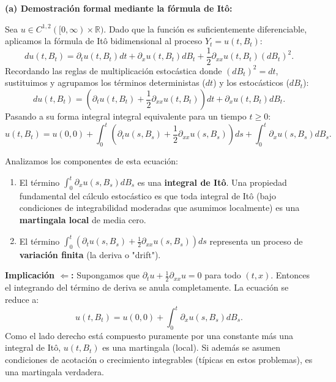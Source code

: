 \documentclass[11pt, letterpaper]{article}
\begin{document}
\begin{solucion}
    \vspace{3mm}
    \textbf{(a) Demostración formal mediante la fórmula de Itô:}

    Sea $u \in C^{1,2}([0, \infty) \times \mathbb{R})$. Dado que la función es suficientemente diferenciable, aplicamos la fórmula de Itô bidimensional al proceso $Y_t = u(t, B_t)$:
    \[ du(t, B_t) = \partial_t u(t, B_t) dt + \partial_x u(t, B_t) dB_t + \frac{1}{2} \partial_{xx} u(t, B_t) (dB_t)^2. \]
    Recordando las reglas de multiplicación estocástica donde $(dB_t)^2 = dt$, sustituimos y agrupamos los términos deterministas ($dt$) y los estocásticos ($dB_t$):
    \[ du(t, B_t) = \left( \partial_t u(t, B_t) + \frac{1}{2} \partial_{xx} u(t, B_t) \right) dt + \partial_x u(t, B_t) dB_t. \]
    Pasando a su forma integral integral equivalente para un tiempo $t \ge 0$:
    \[ u(t, B_t) = u(0, 0) + \int_0^t \left( \partial_t u(s, B_s) + \frac{1}{2} \partial_{xx} u(s, B_s) \right) ds + \int_0^t \partial_x u(s, B_s) dB_s. \]

    Analizamos los componentes de esta ecuación:
    \begin{enumerate}
        \item El término $\int_0^t \partial_x u(s, B_s) dB_s$ es una \textbf{integral de Itô}. Una propiedad fundamental del cálculo estocástico es que toda integral de Itô (bajo condiciones de integrabilidad moderadas que asumimos localmente) es una \textbf{martingala local} de media cero.
        \item El término $\int_0^t \left( \partial_t u(s, B_s) + \frac{1}{2} \partial_{xx} u(s, B_s) \right) ds$ representa un proceso de \textbf{variación finita} (la deriva o "drift").
    \end{enumerate}

    \textbf{Implicación $\Longleftarrow$:}
    Supongamos que $\partial_t u + \frac{1}{2}\partial_{xx} u = 0$ para todo $(t,x)$. Entonces el integrando del término de deriva se anula completamente.
    La ecuación se reduce a:
    \[ u(t, B_t) = u(0, 0) + \int_0^t \partial_x u(s, B_s) dB_s. \]
    Como el lado derecho está compuesto puramente por una constante más una integral de Itô, $u(t, B_t)$ es una martingala (local). Si además se asumen condiciones de acotación o crecimiento integrables (típicas en estos problemas), es una martingala verdadera.


\end{solucion}
\end{document}
